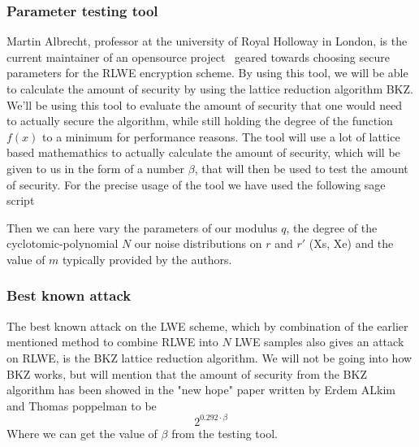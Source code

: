 \documentclass[../main.tex]{subfiles}
\begin{document}
    \subsubsection{Parameter testing tool}
        Martin Albrecht, professor at the university of Royal Holloway in London, is the current maintainer of an
		opensource project~\cite{estimations-tool} geared towards choosing secure parameters for the RLWE encryption scheme.
		By using this tool, we will be able to calculate the amount of security by using the lattice reduction algorithm BKZ.
		We'll be using this tool to evaluate the amount of security that one would need to actually secure the algorithm,
		while still holding the degree of the function $f(x)$ to a minimum for performance reasons.
		The tool will use a lot of lattice based mathemathics to actually calculate the amount of security, which will be given
		to us in the form of a number $\beta$, that will then be used to test the amount of security.
        For the precise usage of the tool we have used the following sage script
        
        Then we can here vary the parameters of our modulus $q$, the degree of the cyclotomic-polynomial $N$
        our noise distributions on $r$ and $r'$ (Xs, Xe) and the value of $m$ typically provided by the authors.

    \subsubsection{Best known attack}
		The best known attack on the LWE scheme, which by combination of the earlier mentioned method to combine RLWE
		into $N$ LWE samples also gives an attack on RLWE, is the BKZ lattice reduction algorithm.
		We will not be going into how BKZ works, but will mention that the amount of security from the BKZ algorithm
		has been showed in the "new hope" paper \cite{usenix16} written by Erdem ALkim and Thomas poppelman to be
		\[ 2^{0.292 \cdot \beta} \]
		Where we can get the value of $\beta$ from the testing tool.
\end{document}
